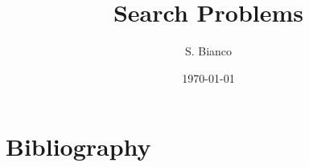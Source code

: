 \documentclass[12pt]{article}
\theoremstyle{definition}
\begin{document}
    \title{Search Problems}
    \author{S. Bianco}
    \date{\today}

    \maketitle

    \hypersetup{linkcolor=black}
    \tableofcontents
    \hypersetup{linkcolor=red}

    \newpage

    

    \newpage
    \section{Bibliography}
    \printbibliography
    
    
\end{document}
